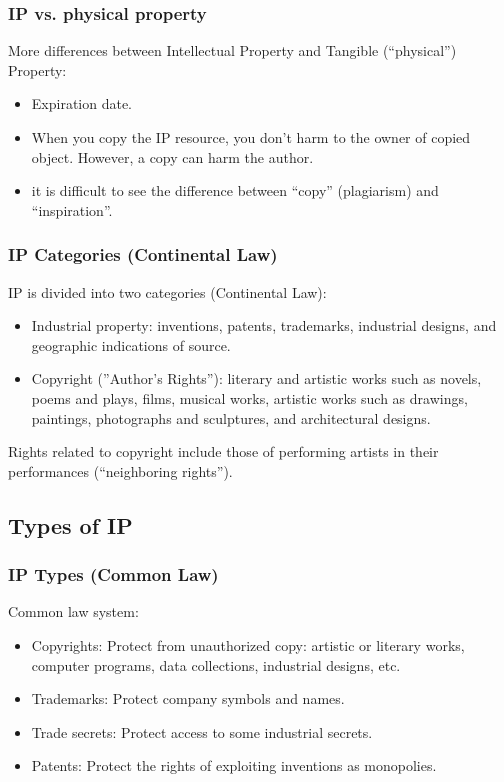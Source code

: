 
\begin{frame}
\frametitle{IP vs. physical property}

More differences between Intellectual Property and Tangible (``physical'')
Property:
\begin{itemize}
\item Expiration date.
\item When you copy the IP resource, you don't harm to the owner of
  copied object. However, a copy can harm the author.
\item it is difficult to see the difference between ``copy'' (plagiarism) and
``inspiration''. 
\end{itemize}

\end{frame}




\begin{frame}
\frametitle{IP Categories (Continental Law)}

IP is divided into two categories (Continental Law):  

\begin{itemize}
\item \alert{Industrial property}: inventions, patents, trademarks, industrial designs, and geographic indications of source. 
\item \alert{Copyright} (''Author's Rights''): literary and artistic works such as novels, poems and plays, films, musical works, artistic works such as drawings, paintings, photographs and sculptures, and architectural designs.  
\end{itemize}

Rights related to copyright include those of performing artists in their performances (``neighboring rights'').  

\end{frame}


\subsection{Types of IP}
\begin{frame}
\frametitle{IP Types (Common Law)}

\alert{Common law} system:
\begin{itemize}
\item \alert{Copyrights}: Protect from unauthorized copy: artistic or literary
  works, computer programs, data collections, industrial designs, etc.
\item \alert{Trademarks}: Protect company symbols and names.
\item \alert{Trade secrets}: Protect access to some industrial secrets.
\item \alert{Patents}: Protect the rights of exploiting inventions as monopolies.
\end{itemize}

\end{frame}



